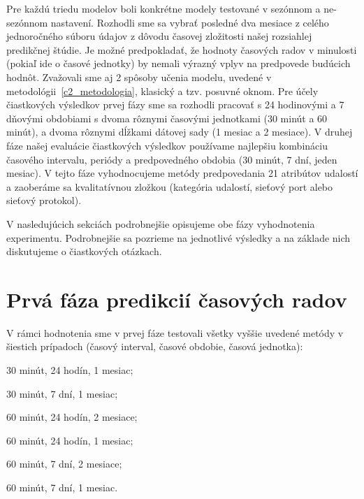\documentclass[thesismargins, thesislinespacing, openright, upjsfrontpage, combineabstracts]{rnthesis}
\begin{document}
Pre každú triedu modelov boli konkrétne modely testované v sezónnom a ne-sezónnom nastavení. Rozhodli sme sa vybrať posledné dva mesiace z celého jednoročného súboru údajov z dôvodu časovej zložitosti našej rozsiahlej predikčnej štúdie. Je možné predpokladať, že hodnoty časových radov v minulosti (pokiaľ ide o časové jednotky) by nemali výrazný vplyv na predpovede budúcich hodnôt. Zvažovali sme aj 2 spôsoby učenia modelu, uvedené v metodológii~\ref{c2_metodologia}, klasický a tzv. posuvné oknom. Pre účely čiastkových výsledkov prvej fázy sme sa rozhodli pracovať s 24 hodinovými a 7 dňovými obdobiami s dvoma rôznymi časovými jednotkami (30 minút a 60 minút), a dvoma rôznymi dĺžkami dátovej sady (1 mesiac a 2 mesiace). V druhej fáze našej evaluácie čiastkových výsledkov používame najlepšiu kombináciu časového intervalu, periódy a predpovedného obdobia (30 minút, 7 dní, jeden mesiac). V tejto fáze vyhodnocujeme metódy predpovedania 21 atribútov udalostí a zaoberáme sa kvalitatívnou zložkou (kategória udalostí, sieťový port alebo sieťový protokol).

V nasledujúcich sekciách podrobnejšie opisujeme obe fázy vyhodnotenia experimentu. Podrobnejšie sa pozrieme na jednotlivé výsledky a na základe nich diskutujeme o čiastkových otázkach.

\section{Prvá fáza predikcií časových radov}

V rámci hodnotenia sme v prvej fáze testovali všetky vyššie uvedené metódy v šiestich prípadoch (časový interval, časové obdobie, časová jednotka): 
\begin{compactenum}
    \item 30 minút, 24 hodín, 1 mesiac; 
    \item 30 minút, 7 dní, 1 mesiac; 
    \item 60 minút, 24 hodín, 2 mesiace; 
    \item 60 minút, 24 hodín, 1 mesiac; 
    \item 60 minút, 7 dní, 2 mesiace; 
    \item 60 minút, 7 dní, 1 mesiac.
\end{compactenum}



\end{document}

